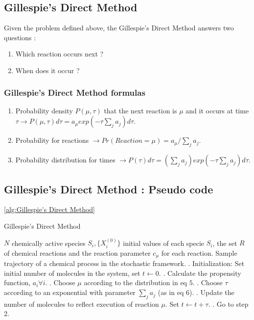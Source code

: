\documentclass[11pt,a4paper]{article}
\begin{document}
\subsection{Gillespie's Direct Method}
Given the problem defined above, the Gillespie's Direct Method answers two questions :
\begin{enumerate}
  \item Which reaction occurs next ?
  \item When does it occur ?
\end{enumerate}

  \subsubsection{Gillespie's Direct Method formulas}
  \begin{enumerate}
    \item Probability density $P(\mu, \tau)$ that the next reaction is $\mu$ and it occurs at time $\tau \rightarrow P(\mu, \tau)d\tau = a_{\mu}exp(-\tau \sum_{j}a_{j})d\tau$.
    \item Probability for reactions $\rightarrow Pr(Reaction = \mu) = a_{\mu} / \sum_{j}a_{j}$.
    \item Probability distribution for times $\rightarrow P(\tau)d\tau = (\sum_{j}a_{j})exp(-\tau \sum_{j}a_{j})d\tau$.
  \end{enumerate}

\subsection{Gillespie's Direct Method : Pseudo code} \ref{alg:Gillespie's Direct Method}
\begin{algorithm}[!h]                     %
\caption{Gillespie's Direct Method}       %
\begin{algorithmic}                       %
\REQUIRE $N$ chemically active species $S_i, \{X_{i}^{(0)}\}$ initial values of each specie $S_i$, the set $R$ of chemical reactions and the reaction parameter $c_{\mu}$ for each reaction.
\ENSURE Sample trajectory of a chemical process in the stochastic framework.
    . Initialization: Set initial number of molecules in the system, set $t \leftarrow 0$.
    . Calculate the propensity function, $a_{i} \forall i$.
    . Choose $\mu$ according to the distribution in eq $5$.
    . Choose $\tau$ according to an exponential with parameter $\sum_{j}a_{j}$ (as in eq $6$).
    . Update the number of molecules to reflect execution of reaction $\mu$. Set $t \leftarrow t + \tau$.
    . Go to step 2.
\ENDWHILE
\end{algorithmic}
\label{alg:Gillespie's Direct Method}
\end{algorithm}
\end{document}
